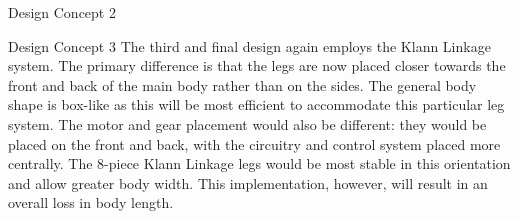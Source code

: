 \begin{homeworkProblem}
\begin{homeworkSection}{Design Concept 2}
\end{homeworkSection}

\begin{homeworkSection}{Design Concept 3}
The third and final design again employs the Klann Linkage system. The primary difference is that the legs are now placed closer towards the front and back of the main body rather than on the sides. The general body shape is box-like as this will be most efficient to accommodate this particular leg system. The motor and gear placement would also be different: they would be placed on the front and back, with the circuitry and control system placed more centrally. The 8-piece Klann Linkage legs would be most stable in this orientation and allow greater body width. This implementation, however, will result in an overall loss in body length. 

\end{homeworkSection}
\end{homeworkProblem}

